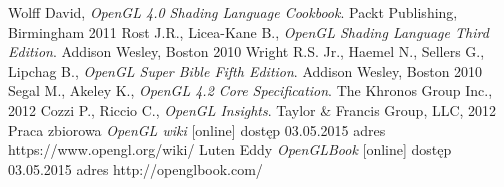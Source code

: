 \newpage
\lstlistoflistings

\newpage
\listoffigures

\newpage
\begin{thebibliography}{99}
\thispagestyle{empty}

	Wolff David, 
	\emph{OpenGL 4.0 Shading Language Cookbook}. 
	Packt Publishing, Birmingham 2011
	Rost J.R., Licea-Kane B.,
	\emph{OpenGL Shading Language Third Edition}.
	Addison Wesley, Boston 2010
	Wright R.S. Jr., Haemel N., Sellers G., Lipchag B.,
	\emph{OpenGL Super Bible Fifth Edition}.
	Addison Wesley, Boston 2010
	Segal M., Akeley K.,
	\emph{OpenGL 4.2 Core Specification}.
	The Khronos Group Inc., 2012
	Cozzi P., Riccio C.,
	\emph{OpenGL Insights}.
	Taylor \& Francis Group, LLC, 2012
	Praca zbiorowa
	\emph{OpenGL wiki}
	[online] dostęp 03.05.2015
	adres https://www.opengl.org/wiki/
	Luten Eddy
	\emph{OpenGLBook}
	[online] dostęp 03.05.2015
	adres http://openglbook.com/



\end{thebibliography}